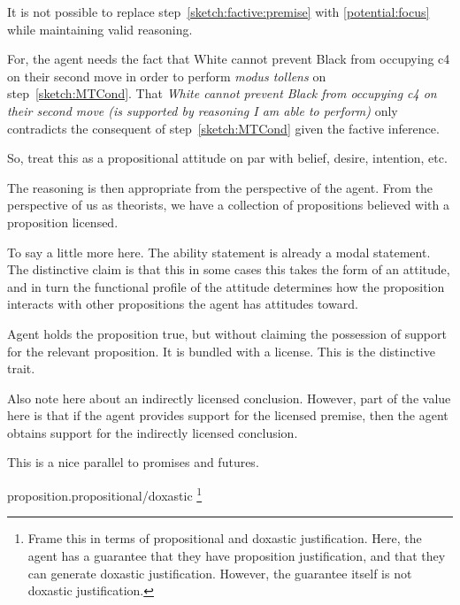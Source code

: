 \documentclass[10pt]{article}
\begin{document}
It is not possible to replace step~\ref{sketch:factive:premise} with \ref{potential:focus} while maintaining valid reasoning.

For, the agent needs the fact that White cannot prevent Black from occupying c4 on their second move in order to perform \emph{modus tollens} on step~\ref{sketch:MTCond}.
That \emph{White cannot prevent Black from occupying c4 on their second move (is supported by reasoning I am able to perform)} only contradicts the consequent of step~\ref{sketch:MTCond} given the factive inference.



So, treat this as a propositional attitude on par with belief, desire, intention, etc.



The reasoning is then appropriate from the perspective of the agent.
From the perspective of us as theorists, we have a collection of propositions believed with a proposition licensed.


To say a little more here.
The ability statement is already a modal statement.
The distinctive claim is that this in some cases this takes the form of an attitude, and in turn the functional profile of the attitude determines how the proposition interacts with other propositions the agent has attitudes toward.


Agent holds the proposition true, but without claiming the possession of support for the relevant proposition.
It is bundled with a license.
This is the distinctive trait.

\begin{note}
  Also note here about an indirectly licensed conclusion.
  However, part of the value here is that if the agent provides support for the licensed premise, then the agent obtains support for the indirectly licensed conclusion.

  This is a nice parallel to promises and futures.
\end{note}



\begin{note}
  proposition.propositional/doxastic\nolinebreak
  \footnote{
    Frame this in terms of propositional and doxastic justification.
    Here, the agent has a guarantee that they have proposition justification, and that they can generate doxastic justification.
    However, the guarantee itself is not doxastic justification. }
\end{note}
\end{document}

